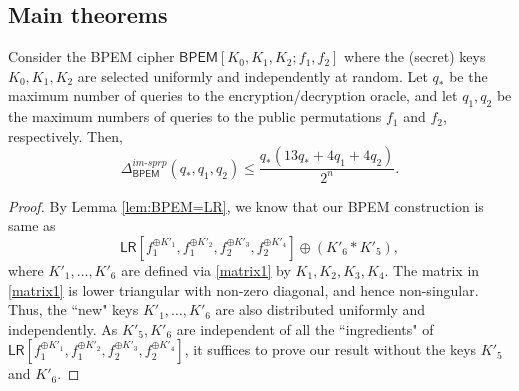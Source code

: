 \documentclass{llncs}
\newcommand{\tx}{\textsf}
\begin{document}
\subsection{Main theorems}
\begin{theorem}\label{thm:indistinguish}
Consider the BPEM cipher $\tx{BPEM}[K_0, K_1, K_2;f_1,f_2]$ where the (secret) keys
$K_0, K_1, K_2$ are selected uniformly and independently at random.
Let $q_{*}$ be the maximum number of queries to the encryption/decryption oracle, and let $q_1, q_2$ be the maximum numbers of queries to the public permutations $f_1$ and $f_2$, respectively. Then,
$$
\Delta^{im\textit{-}sprp}_{\tx{BPEM}}(q_{*},q_1, q_2)\leq
\frac{q_{*}(13q_{*}+4q_1+4q_2)}{2^n}.
$$
\end{theorem}

\begin{proof}
By Lemma \ref{lem:BPEM=LR}, we know that our BPEM construction is same as $$\tx{LR}[f_1^{\oplus K'_1}, f_1^{\oplus K'_2}, f_2^{\oplus K'_3}, f_2^{\oplus K'_4}] \oplus (K'_6 * K'_5),$$
where $K'_1, \ldots, K'_6$ are defined via \eqref{matrix1} by $K_1,K_2,K_3,K_4$. The matrix in \eqref{matrix1} is lower triangular with non-zero diagonal, and hence non-singular. Thus, the ``new" keys $K'_1, \ldots, K'_6$ are also distributed uniformly and independently. As $K'_5, K'_6$ are independent of all the ``ingredients" of  $\tx{LR}[f_1^{\oplus K'_1}, f_1^{\oplus K'_2}, f_2^{\oplus K'_3}, f_2^{\oplus K'_4}]$, it suffices to prove our result without the keys $K'_5$ and $K'_6$.


\end{proof}
\end{document}
